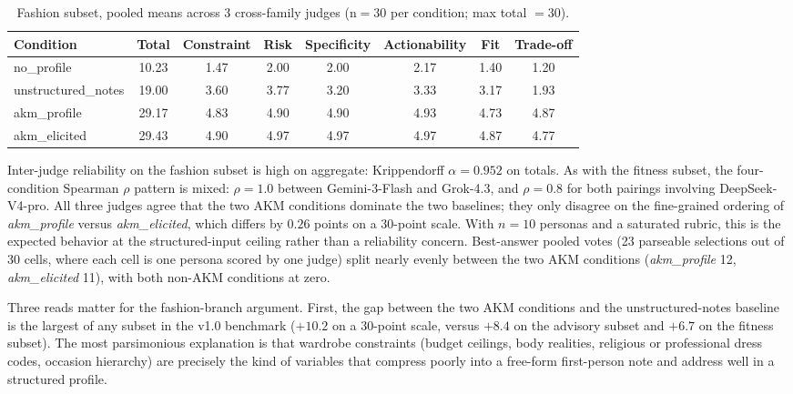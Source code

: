 \documentclass[11pt]{article}
\begin{document}
\begin{table}[htbp]
\centering
\caption{Fashion subset, pooled means across 3 cross-family judges (n${=}$30 per condition; max total ${=}30$).}
\label{tab:fashion_pooled}
\small
\begin{tabular}{lccccccc}
\toprule
Condition & Total & Constraint & Risk & Specificity & Actionability & Fit & Trade-off \\
\midrule
no\_profile          & 10.23 & 1.47 & 2.00 & 2.00 & 2.17 & 1.40 & 1.20 \\
unstructured\_notes  & 19.00 & 3.60 & 3.77 & 3.20 & 3.33 & 3.17 & 1.93 \\
akm\_profile         & 29.17 & 4.83 & 4.90 & 4.90 & 4.93 & 4.73 & 4.87 \\
akm\_elicited        & 29.43 & 4.90 & 4.97 & 4.97 & 4.97 & 4.87 & 4.77 \\
\bottomrule
\end{tabular}
\end{table}

Inter-judge reliability on the fashion subset is high on aggregate: Krippendorff $\alpha = 0.952$ on totals. As with the fitness subset, the four-condition Spearman $\rho$ pattern is mixed: $\rho = 1.0$ between Gemini-3-Flash and Grok-4.3, and $\rho = 0.8$ for both pairings involving DeepSeek-V4-pro. All three judges agree that the two AKM conditions dominate the two baselines; they only disagree on the fine-grained ordering of \textit{akm\_profile} versus \textit{akm\_elicited}, which differs by $0.26$ points on a 30-point scale. With $n=10$ personas and a saturated rubric, this is the expected behavior at the structured-input ceiling rather than a reliability concern. Best-answer pooled votes (23 parseable selections out of 30 cells, where each cell is one persona scored by one judge) split nearly evenly between the two AKM conditions (\textit{akm\_profile} 12, \textit{akm\_elicited} 11), with both non-AKM conditions at zero.

Three reads matter for the fashion-branch argument. First, the gap between the two AKM conditions and the unstructured-notes baseline is the largest of any subset in the v1.0 benchmark ($+10.2$ on a 30-point scale, versus $+8.4$ on the advisory subset and $+6.7$ on the fitness subset). The most parsimonious explanation is that wardrobe constraints (budget ceilings, body realities, religious or professional dress codes, occasion hierarchy) are precisely the kind of variables that compress poorly into a free-form first-person note and address well in a structured profile.
\end{document}
